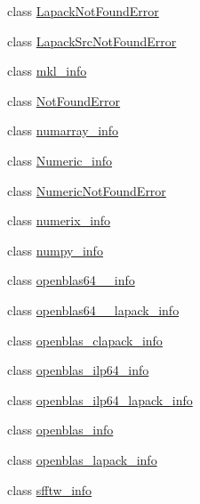 \begin{DoxyCompactItemize}
\item 
class \hyperlink{classnumpy_1_1distutils_1_1system__info_1_1LapackNotFoundError}{Lapack\+Not\+Found\+Error}
\item 
class \hyperlink{classnumpy_1_1distutils_1_1system__info_1_1LapackSrcNotFoundError}{Lapack\+Src\+Not\+Found\+Error}
\item 
class \hyperlink{classnumpy_1_1distutils_1_1system__info_1_1mkl__info}{mkl\+\_\+info}
\item 
class \hyperlink{classnumpy_1_1distutils_1_1system__info_1_1NotFoundError}{Not\+Found\+Error}
\item 
class \hyperlink{classnumpy_1_1distutils_1_1system__info_1_1numarray__info}{numarray\+\_\+info}
\item 
class \hyperlink{classnumpy_1_1distutils_1_1system__info_1_1Numeric__info}{Numeric\+\_\+info}
\item 
class \hyperlink{classnumpy_1_1distutils_1_1system__info_1_1NumericNotFoundError}{Numeric\+Not\+Found\+Error}
\item 
class \hyperlink{classnumpy_1_1distutils_1_1system__info_1_1numerix__info}{numerix\+\_\+info}
\item 
class \hyperlink{classnumpy_1_1distutils_1_1system__info_1_1numpy__info}{numpy\+\_\+info}
\item 
class \hyperlink{classnumpy_1_1distutils_1_1system__info_1_1openblas64____info}{openblas64\+\_\+\+\_\+info}
\item 
class \hyperlink{classnumpy_1_1distutils_1_1system__info_1_1openblas64____lapack__info}{openblas64\+\_\+\+\_\+lapack\+\_\+info}
\item 
class \hyperlink{classnumpy_1_1distutils_1_1system__info_1_1openblas__clapack__info}{openblas\+\_\+clapack\+\_\+info}
\item 
class \hyperlink{classnumpy_1_1distutils_1_1system__info_1_1openblas__ilp64__info}{openblas\+\_\+ilp64\+\_\+info}
\item 
class \hyperlink{classnumpy_1_1distutils_1_1system__info_1_1openblas__ilp64__lapack__info}{openblas\+\_\+ilp64\+\_\+lapack\+\_\+info}
\item 
class \hyperlink{classnumpy_1_1distutils_1_1system__info_1_1openblas__info}{openblas\+\_\+info}
\item 
class \hyperlink{classnumpy_1_1distutils_1_1system__info_1_1openblas__lapack__info}{openblas\+\_\+lapack\+\_\+info}
\item 
class \hyperlink{classnumpy_1_1distutils_1_1system__info_1_1sfftw__info}{sfftw\+\_\+info}
\item 

\end{DoxyCompactItemize}
